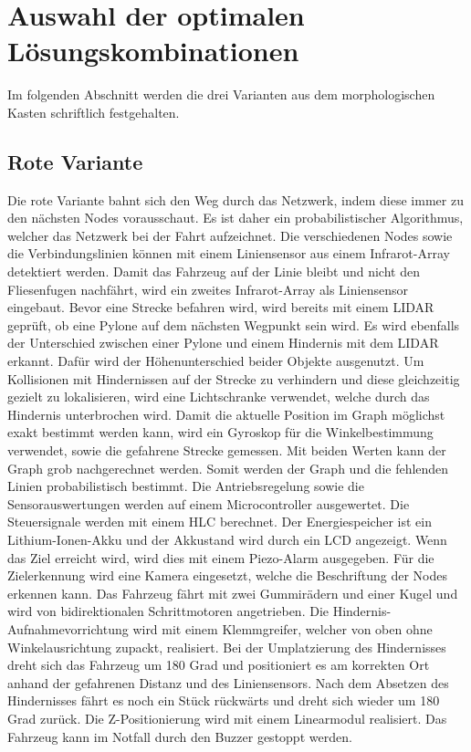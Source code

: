 \documentclass[main.tex]{subfiles} %
\begin{document}


\section{Auswahl der optimalen Lösungskombinationen}
Im folgenden Abschnitt werden die drei Varianten aus dem morphologischen Kasten schriftlich festgehalten.

\subsection{Rote Variante}
Die rote Variante bahnt sich den Weg durch das Netzwerk, indem diese immer zu den nächsten Nodes vorausschaut. Es ist daher ein probabilistischer Algorithmus, welcher das Netzwerk bei der Fahrt aufzeichnet. Die verschiedenen Nodes sowie die Verbindungslinien können mit einem Liniensensor aus einem Infrarot-Array detektiert werden. Damit das Fahrzeug auf der Linie bleibt und nicht den Fliesenfugen nachfährt, wird ein zweites Infrarot-Array als Liniensensor eingebaut. Bevor eine Strecke befahren wird, wird bereits mit einem LIDAR geprüft, ob eine Pylone auf dem nächsten Wegpunkt sein wird. Es wird ebenfalls der Unterschied zwischen einer Pylone und einem Hindernis mit dem LIDAR erkannt. Dafür wird der Höhenunterschied beider Objekte ausgenutzt. Um Kollisionen mit Hindernissen auf der Strecke zu verhindern und diese gleichzeitig gezielt zu lokalisieren, wird eine Lichtschranke verwendet, welche durch das Hindernis unterbrochen wird. Damit die aktuelle Position im Graph möglichst exakt bestimmt werden kann, wird ein Gyroskop für die Winkelbestimmung verwendet, sowie die gefahrene Strecke gemessen. Mit beiden Werten kann der Graph grob nachgerechnet werden. Somit werden der Graph und die fehlenden Linien probabilistisch bestimmt. Die Antriebsregelung sowie die Sensorauswertungen werden auf einem Microcontroller ausgewertet. Die Steuersignale werden mit einem HLC berechnet.\newline
Der Energiespeicher ist ein Lithium-Ionen-Akku und der Akkustand wird durch ein LCD angezeigt. Wenn das Ziel erreicht wird, wird dies mit einem Piezo-Alarm ausgegeben. Für die Zielerkennung wird eine Kamera eingesetzt, welche die Beschriftung der Nodes erkennen kann.\newline
Das Fahrzeug fährt mit zwei Gummirädern und einer Kugel und wird von bidirektionalen Schrittmotoren angetrieben. Die Hindernis-Aufnahmevorrichtung wird mit einem Klemmgreifer, welcher von oben ohne Winkelausrichtung zupackt, realisiert. Bei der Umplatzierung des Hindernisses dreht sich das Fahrzeug um 180 Grad und positioniert es am korrekten Ort anhand der gefahrenen Distanz und des Liniensensors. Nach dem Absetzen des Hindernisses fährt es noch ein Stück rückwärts und dreht sich wieder um 180 Grad zurück. Die Z-Positionierung wird mit einem Linearmodul realisiert. Das Fahrzeug kann im Notfall durch den Buzzer gestoppt werden.
\end{document}
